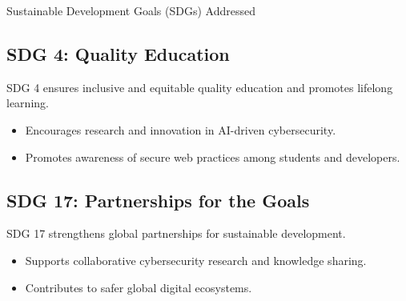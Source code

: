 \documentclass[aspectratio=169,xcolor=dvipsnames]{beamer}
\begin{document}
\begin{frame}{Sustainable Development Goals (SDGs) Addressed}
\subsection*{SDG 4: Quality Education}

SDG 4 ensures inclusive and equitable quality education and promotes lifelong learning.

\begin{itemize}
    \item Encourages research and innovation in AI-driven cybersecurity.
    \item Promotes awareness of secure web practices among students and developers.
\end{itemize}


\subsection*{SDG 17: Partnerships for the Goals}

SDG 17 strengthens global partnerships for sustainable development.

\begin{itemize}
    \item Supports collaborative cybersecurity research and knowledge sharing.
    \item Contributes to safer global digital ecosystems.
\end{itemize}


\end{frame}
\end{document}
